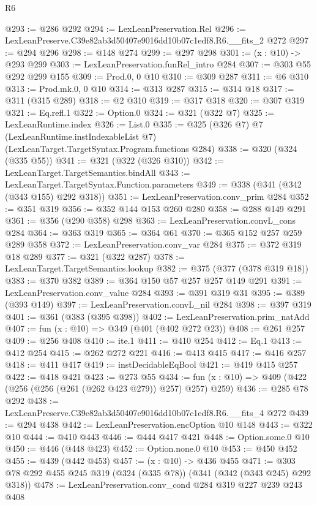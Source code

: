 \begin{lexlean}{R6}
\begin{coremodule}
@293 := @286 @292
@294 := LexLeanPreservation.Rel
@296 := LexLeanPreserve.C39e82ab3d50407e9016dd10b07c1edf8.R6.__fits_2 @272
@297 := @294 @296
@298 := @148 @274
@299 := @297 @298
@301 := (x : @10) -> @293 @299
@303 := LexLeanPreservation.funRel_intro @284
@307 := @303 @55 @292 @299 @155
@309 := Prod.{0, 0} @10
@310 := @309 @287
@311 := @6 @310
@313 := Prod.mk.{0, 0} @10
@314 := @313 @287
@315 := @314 @18
@317 := @311 (@315 @289)
@318 := @2 @310
@319 := @317 @318
@320 := @307 @319
@321 := Eq.refl.{1}
@322 := Option.{0}
@324 := @321 (@322 @7)
@325 := LexLeanRuntime.index
@326 := List.{0}
@335 := @325
    (@326 @7)
    @7
    (LexLeanRuntime.instIndexableList @7)
    (LexLeanTarget.TargetSyntax.Program.functions @284)
@338 := @320 (@324 (@335 @55))
@341 := @321 (@322 (@326 @310))
@342 := LexLeanTarget.TargetSemantics.bindAll
@343 := LexLeanTarget.TargetSyntax.Function.parameters
@349 := @338 (@341 (@342 (@343 @155) @292 @318))
@351 := LexLeanPreservation.conv_prim @284
@352 := @351 @319
@356 := @352 @144 @153 @260 @280
@358 := @288 @149 @291
@361 := @356 (@290 @358) @298
@363 := LexLeanPreservation.convL_cons @284
@364 := @363 @319
@365 := @364 @61
@370 := @365 @152 @257 @259 @289 @358
@372 := LexLeanPreservation.conv_var @284
@375 := @372 @319 @18 @289
@377 := @321 (@322 @287)
@378 := LexLeanTarget.TargetSemantics.lookup
@382 := @375 (@377 (@378 @319 @18))
@383 := @370 @382
@389 := @364 @150 @57 @257 @257 @149 @291
@391 := LexLeanPreservation.conv_value @284
@393 := @391 @319 @31
@395 := @389 (@393 @149)
@397 := LexLeanPreservation.convL_nil @284
@398 := @397 @319
@401 := @361 (@383 (@395 @398))
@402 := LexLeanPreservation.prim_natAdd
@407 := fun (x : @10) => @349 (@401 (@402 @272 @23))
@408 := @261 @257
@409 := @256 @408
@410 := ite.{1}
@411 := @410 @254
@412 := Eq.{1}
@413 := @412 @254
@415 := @262 @272 @221
@416 := @413 @415
@417 := @416 @257
@418 := @411 @417
@419 := instDecidableEqBool
@421 := @419 @415 @257
@422 := @418 @421
@423 := @273 @55
@434 := fun (x : @10) => @409 (@422 (@256 (@256 (@261 (@262 @423 @279)) @257) @257) @259)
@436 := @285 @78 @292
@438 := LexLeanPreserve.C39e82ab3d50407e9016dd10b07c1edf8.R6.__fits_4 @272
@439 := @294 @438
@442 := LexLeanPreservation.encOption @10 @148
@443 := @322 @10
@444 := @410 @443
@446 := @444 @417 @421
@448 := Option.some.{0} @10
@450 := @446 (@448 @423)
@452 := Option.none.{0} @10
@453 := @450 @452
@455 := @439 (@442 @453)
@457 := (x : @10) -> @436 @455
@471 := @303 @78 @292 @455 @245 @319 (@324 (@335 @78)) (@341 (@342 (@343 @245) @292 @318))
@478 := LexLeanPreservation.conv_cond @284 @319 @227 @239 @243 @408

\end{coremodule}
\end{lexlean}
